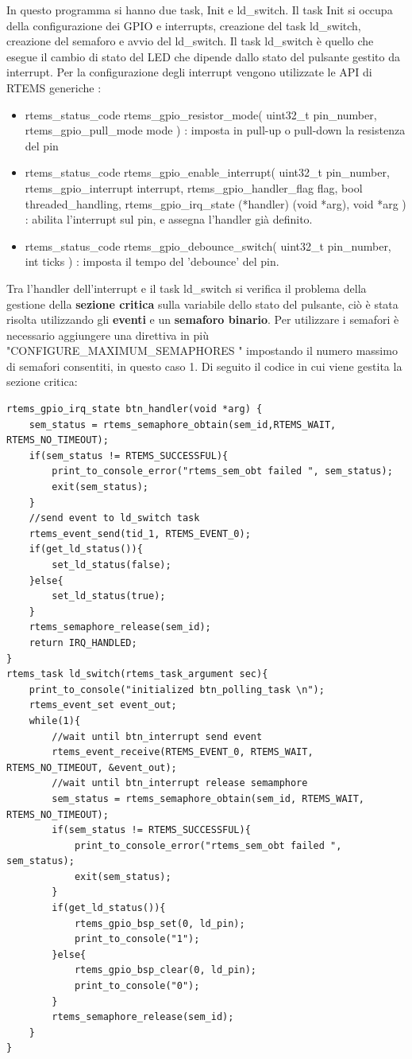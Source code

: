 \documentclass[12pt, a4paper, titlepage, oneside]{book}
\begin{document}
In questo programma si hanno due task, Init e ld\_switch.
Il task Init si occupa della configurazione dei GPIO e interrupts, creazione del task ld\_switch, creazione del semaforo e avvio del ld\_switch.
Il task ld\_switch è quello che esegue il cambio di stato del LED che dipende dallo stato del pulsante gestito da interrupt.
Per la configurazione degli interrupt vengono utilizzate le API di RTEMS generiche :
\begin{itemize}
    \item rtems\_status\_code rtems\_gpio\_resistor\_mode(
  uint32\_t pin\_number,
   rtems\_gpio\_pull\_mode mode
) : imposta in pull-up o pull-down la resistenza del pin
    \item rtems\_status\_code rtems\_gpio\_enable\_interrupt(
  uint32\_t pin\_number,
  rtems\_gpio\_interrupt interrupt,
  rtems\_gpio\_handler\_flag flag,
  bool threaded\_handling,
  rtems\_gpio\_irq\_state (*handler) (void *arg),
  void *arg
) : abilita l'interrupt sul pin, e assegna l'handler già definito.
    \item rtems\_status\_code rtems\_gpio\_debounce\_switch(
  uint32\_t pin\_number,
  int ticks
) : imposta il tempo del 'debounce' del pin.
\end{itemize}
Tra l'handler dell'interrupt e il task ld\_switch si verifica il problema della gestione della \textbf{sezione critica} sulla variabile dello stato del pulsante, ciò è stata risolta utilizzando gli \textbf{eventi} e un \textbf{semaforo binario}.\newline
Per utilizzare i semafori è necessario aggiungere una direttiva in più "CONFIGURE\_MAXIMUM\_SEMAPHORES " impostando il numero massimo di semafori consentiti, in questo caso 1. \newline
Di seguito il codice in cui viene gestita la sezione critica:
\begin{lstlisting}[style = CStyle]
rtems_gpio_irq_state btn_handler(void *arg) {
	sem_status = rtems_semaphore_obtain(sem_id,RTEMS_WAIT, RTEMS_NO_TIMEOUT);
	if(sem_status != RTEMS_SUCCESSFUL){
		print_to_console_error("rtems_sem_obt failed ", sem_status);
		exit(sem_status);
	}
	//send event to ld_switch task
	rtems_event_send(tid_1, RTEMS_EVENT_0);
	if(get_ld_status()){
		set_ld_status(false);
	}else{
		set_ld_status(true);
	}
	rtems_semaphore_release(sem_id);
	return IRQ_HANDLED;
}
rtems_task ld_switch(rtems_task_argument sec){
	print_to_console("initialized btn_polling_task \n");
	rtems_event_set event_out;
	while(1){
		//wait until btn_interrupt send event
		rtems_event_receive(RTEMS_EVENT_0, RTEMS_WAIT, RTEMS_NO_TIMEOUT, &event_out);
		//wait until btn_interrupt release semamphore
		sem_status = rtems_semaphore_obtain(sem_id, RTEMS_WAIT, RTEMS_NO_TIMEOUT);
		if(sem_status != RTEMS_SUCCESSFUL){
			print_to_console_error("rtems_sem_obt failed ", sem_status);
			exit(sem_status);
		}
		if(get_ld_status()){
			rtems_gpio_bsp_set(0, ld_pin);
			print_to_console("1");
		}else{
			rtems_gpio_bsp_clear(0, ld_pin);
			print_to_console("0");
		}
		rtems_semaphore_release(sem_id);
	}
}
\end{lstlisting}
\end{document}
